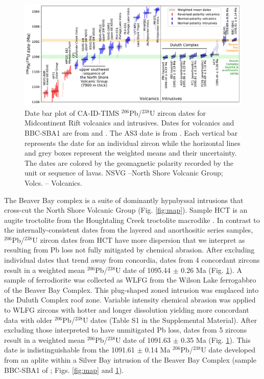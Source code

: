 \documentclass[11pt,letterpaper]{article}
\begin{document}
\begin{figure}[!ht]
\noindent\includegraphics[width=\textwidth]{./Figures/MCR_Dates.pdf}
\caption{\small{Date bar plot of CA-ID-TIMS $^{206}$Pb/$^{238}$U zircon dates for Midcontinent Rift volcanics and intrusives. Dates for volcanics and BBC-SBA1 are from \cite{Fairchild2017a} and \cite{Swanson-Hysell2019a}. The AS3 date is from \cite{Schoene2006a}. Each vertical bar represents the date for an individual zircon while the horizontal lines and grey boxes represent the weighted means and their uncertainty. The dates are colored by the geomagnetic polarity recorded by the unit or sequence of lavas. NSVG --North Shore Volcanic Group; Volcs. -- Volcanics.}}
\label{fig:dates}
\end{figure}

The Beaver Bay complex is a suite of dominantly hypabyssal intrusions that cross-cut the North Shore Volcanic Group (Fig. \ref{fig:map}). Sample HCT is an augite troctolite from the Houghtaling Creek troctolite macrodike \citep{Miller2001a}. In contrast to the internally-consistent dates from the layered and anorthositic series samples, $^{206}$Pb/$^{238}$U zircon dates from HCT have more dispersion that we interpret as resulting from Pb loss not fully mitigated by chemical abrasion. After excluding individual dates that trend away from concordia, dates from 4 concordant zircons result in a weighted mean $^{206}$Pb/$^{238}$U date of 1095.44 $\pm$ 0.26 Ma (Fig. \ref{fig:dates}). A sample of ferrodiorite was collected as WLFG from the Wilson Lake ferrogabbro of the Beaver Bay Complex. This plug-shaped zoned intrusion was emplaced into the Duluth Complex roof zone. Variable intensity chemical abrasion was applied to WLFG zircons with hotter and longer dissolution yielding more concordant data with older $^{206}$Pb/$^{238}$U dates (Table S1 in the Supplemental Material). After excluding those interpreted to have unmitigated Pb loss, dates from 5 zircons result in a weighted mean $^{206}$Pb/$^{238}$U date of 1091.63 $\pm$ 0.35 Ma (Fig. \ref{fig:dates}). This date is indistinguishable from the 1091.61 $\pm$ 0.14 Ma $^{206}$Pb/$^{238}$U date developed from an aplite within a Silver Bay intrusion of the Beaver Bay Complex (sample BBC-SBA1 of \citealp{Fairchild2017a}; Figs. \ref{fig:map} and \ref{fig:dates}).
\end{document}
